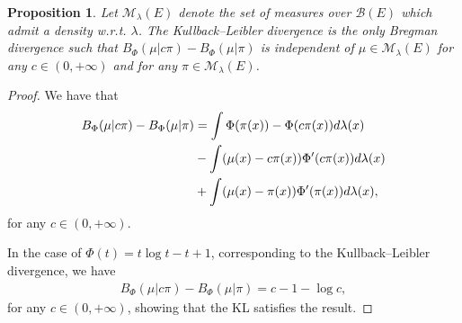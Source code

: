 \documentclass{article}
\newcommand{\cM}{\mathcal M}
\newcommand{\X}{E}
\newtheorem{proposition}{Proposition}
\begin{document}
\begin{proposition}
\label{prop:main}
 Let $\cM_{\lambda}(\X)$ denote the set of measures over $\mathcal{B}(E)$ which admit a density w.r.t. $\lambda$.
    The Kullback--Leibler divergence is the only Bregman divergence such that $B_\Phi(\mu|c\pi) -B_\Phi(\mu|\pi) $ is independent of $\mu\in\cM_{\lambda}(\X)$ for any $c\in(0, +\infty)$ and for any $\pi\in\cM_{\lambda}(\X)$.
\end{proposition}
\begin{proof}
We have that
\begin{align}
\label{eq:proof1}
   B_\Phi(\mu|c\pi) -B_\Phi(\mu|\pi) &= \int \Phi(\pi(x))- \Phi(c\pi(x))d\lambda(x) \\
   &-\int (\mu(x)-c\pi(x))\Phi'(c\pi(x))d\lambda(x) \notag\\
   &+\int (\mu(x)-\pi(x))\Phi'(\pi(x))d\lambda(x), \notag
\end{align}
for any $c\in(0, +\infty)$.

In the case of $\Phi(t) = t\log t-t+1$, corresponding to the Kullback--Leibler divergence, we have
\begin{align*}
   B_\Phi(\mu|c\pi) -B_\Phi(\mu|\pi) = c-1-\log c,
\end{align*}
for any $c\in(0, +\infty)$, showing that the KL satisfies the result.


\end{proof}
\end{document}
